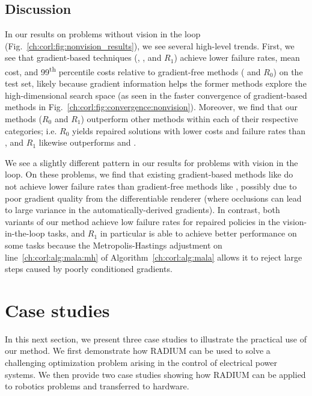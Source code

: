 \subsection{Discussion}

In our results on problems without vision in the loop (Fig.~\ref{ch:corl:fig:nonvision_results}), we see several high-level trends. First, we see that gradient-based techniques (\gdr, \gda, and $R_1$) achieve lower failure rates, mean cost, and 99\textsuperscript{th} percentile costs relative to gradient-free methods (\ltc{} and $R_0$) on the test set, likely because gradient information helps the former methods explore the high-dimensional search space (as seen in the faster convergence of gradient-based methods in Fig.~\ref{ch:corl:fig:convergence:nonvision}). Moreover, we find that our methods ($R_0$ and $R_1$) outperform other methods within each of their respective categories; i.e. $R_0$ yields repaired solutions with lower costs and failure rates than \ltc, and $R_1$ likewise outperforms \gdr{} and \gda{}.

We see a slightly different pattern in our results for problems with vision in the loop. On these problems, we find that existing gradient-based methods like \gda{} do not achieve lower failure rates than gradient-free methods like \ltc{}, possibly due to poor gradient quality from the differentiable renderer (where occlusions can lead to large variance in the automatically-derived gradients). In contrast, both variants of our method achieve low failure rates for repaired policies in the vision-in-the-loop tasks, and $R_1$ in particular is able to achieve better performance on some tasks because the Metropolis-Hastings adjustment on line~\ref{ch:corl:alg:mala:mh} of Algorithm~\ref{ch:corl:alg:mala} allows it to reject large steps caused by poorly conditioned gradients.

\section{Case studies}\label{ch:corl:case_studies}

In this next section, we present three case studies to illustrate the practical use of our method. We first demonstrate how RADIUM can be used to solve a challenging optimization problem arising in the control of electrical power systems. We then provide two case studies showing how RADIUM can be applied to robotics problems and transferred to hardware.  %

